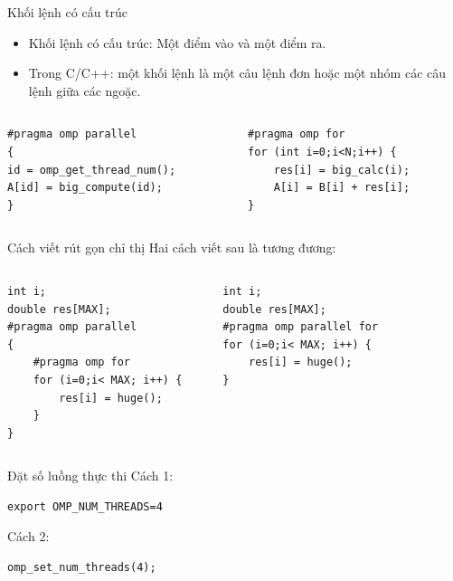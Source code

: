 \documentclass[10pt]{beamer}
\theoremstyle{remark}
\numberwithin{algocf}{section}
\numberwithin{equation}{section}
\numberwithin{dl}{section}
\numberwithin{figure}{section}
\begin{document}
\begin{frame}[fragile]{Khối lệnh có cấu trúc}
    \begin{itemize}
        \item Khối lệnh có cấu trúc: Một điểm vào và một điểm ra.
        \item Trong C/C++: một khối lệnh là một câu lệnh đơn hoặc một nhóm các câu lệnh giữa các ngoặc.
    \end{itemize}

    \begin{columns}[onlytextwidth]
        \begin{column}{0.5\textwidth}
            \begin{verbatim}
#pragma omp parallel
{
id = omp_get_thread_num(); 
A[id] = big_compute(id);
}		
            \end{verbatim}
        \end{column}
        \begin{column}{0.5\textwidth}
            \begin{verbatim}
#pragma omp for
for (int i=0;i<N;i++) {
    res[i] = big_calc(i);
    A[i] = B[i] + res[i]; 
}
            \end{verbatim}
        \end{column}
    \end{columns}
\end{frame}

\begin{frame}[fragile]{Cách viết rút gọn chỉ thị}
    Hai cách viết sau là tương đương:
    \begin{columns}[onlytextwidth]
        \begin{column}{0.5\textwidth}
            \begin{verbatim}
int i;
double res[MAX];
#pragma omp parallel				
{
    #pragma omp for
    for (i=0;i< MAX; i++) {
        res[i] = huge();
    } 
}
            \end{verbatim}
        \end{column}
        \begin{column}{0.5\textwidth}
            \begin{verbatim}
int i;
double res[MAX];
#pragma omp parallel for					
for (i=0;i< MAX; i++) {
    res[i] = huge();
}
            \end{verbatim}
        \end{column}
    \end{columns}
\end{frame}

\begin{frame}[fragile]{Đặt số luồng thực thi}
    Cách 1:
    \begin{verbatim}
export OMP_NUM_THREADS=4
    \end{verbatim}
    Cách 2:
    \begin{verbatim}
omp_set_num_threads(4);
    \end{verbatim}
\end{frame}
\end{document}
